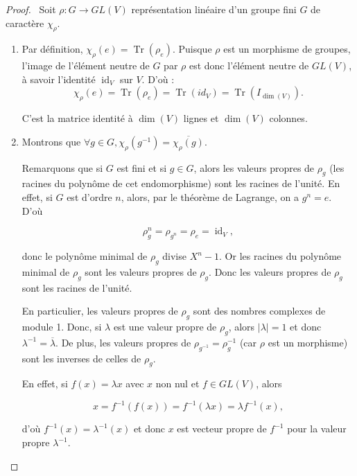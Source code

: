 \documentclass[french]{book}
\theoremstyle{definition}
\theoremstyle{remark}
\begin{document}

\begin{proof}

  \
  Soit \(\rho : G \longrightarrow GL(V)\) représentation linéaire d'un groupe fini \(G\) de caractère \(\chi _{\rho}\).
  \begin{enumerate}
    \item Par définition, \(\chi _{\rho}(e) = \operatorname{Tr}(\rho_e) \). Puisque \(\rho\) est un morphisme de groupes, l'image de l'élément neutre de \(G\) par \(\rho\) est donc l'élément neutre de \(GL(V)\), à savoir l'identité \(\operatorname{id}_V\) sur \(V\). D'où : \[\chi _{\rho}(e) = \operatorname{Tr}(\rho_e) = \operatorname{Tr}(id_V) = \operatorname{Tr}(I _{\operatorname{dim}(V)}). \]

    C'est la matrice identité à \(\operatorname{dim}(V)\) lignes et \(\operatorname{dim}(V)\) colonnes.

    \item Montrons que \(\forall g \in G, \chi _{\rho}(g ^{-1} ) = \overline{\chi _{\rho}(g)}\).

    Remarquons que si \(G\) est fini et si \(g \in G\), alors les valeurs propres de \(\rho_g\) (les racines du polynôme de cet endomorphisme) sont les racines de l'unité. En effet, si \(G\) est d'ordre \(n\), alors, par le théorème de Lagrange, on a \(g ^{n} = e\). D'où

    \[\rho_g ^{n} = \rho _{g ^{n}} = \rho_e = \operatorname{id}_V,\]

    donc le polynôme minimal de \(\rho_g\) divise \(X ^{n}-1\). Or les racines du polynôme minimal de \(\rho_g\) sont les valeurs propres de \(\rho_g\). Donc les valeurs propres de \(\rho_g\) sont les racines de l'unité.

    En particulier, les valeurs propres de \(\rho_g\) sont des nombres complexes de module 1. Donc, si \(\lambda \) est une valeur propre de \(\rho_g\), alors \(\lvert \lambda  \rvert = 1\) et donc \(\lambda  ^{-1} = \overline{\lambda }\). De plus, les valeurs propres de \(\rho _{g ^{-1}} = \rho _{g} ^{-1} \) (car \(\rho\) est un morphisme) sont les inverses de celles de \(\rho_g\).

    En effet, si \(f(x) = \lambda x\) avec \(x\) non nul et \(f \in GL(V)\), alors

    \[x =  f ^{-1} (f(x)) = f ^{-1} (\lambda x) = \lambda f ^{-1} (x),\]

    d'où \(f ^{-1} (x) = \lambda ^{-1} (x)\) et donc \(x\) est vecteur propre de \(f ^{-1} \) pour la valeur propre \(\lambda ^{-1} \).


\end{enumerate}
\end{proof}
\end{document}
